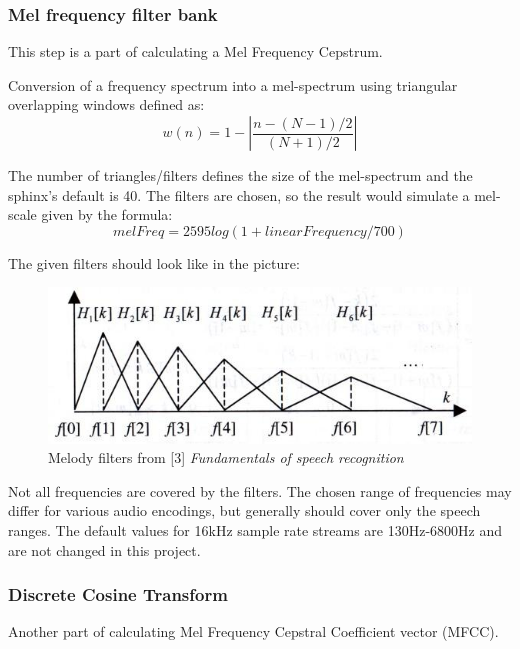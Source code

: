 \documentclass[12pt,a4paper,english]{article}
\begin{document}
\newpage

\subsubsection{Mel frequency filter bank}

This step is a part of calculating a Mel Frequency Cepstrum. \newline

Conversion of a frequency spectrum into a mel-spectrum using triangular overlapping windows defined as:
\begin{equation}
    w(n) = 1 - |\frac{n - (N - 1)/2}{(N + 1)/2}|
\end{equation}


The number of triangles/filters defines the size of the mel-spectrum and the sphinx's default is 40. \newline
The filters are chosen, so the result would simulate a mel-scale given by the formula:
\begin{equation}
    melFreq = 2595 log(1 + linearFrequency / 700)
\end{equation}

The given filters should look like in the picture:
\begin{figure}[hb]
    \centering
    \includegraphics[scale=0.4]{mel_filters.jpg}
    \caption[]{Melody filters from [3] \emph{Fundamentals of speech recognition}}
\end{figure}

Not all frequencies are covered by the filters.
The chosen range of frequencies may differ for various audio encodings,
but generally should cover only the speech ranges.
The default values for 16kHz sample rate streams are 130Hz-6800Hz and are not changed in this project.

\subsubsection{Discrete Cosine Transform}

Another part of calculating Mel Frequency Cepstral Coefficient vector (MFCC).  \newline
\end{document}
